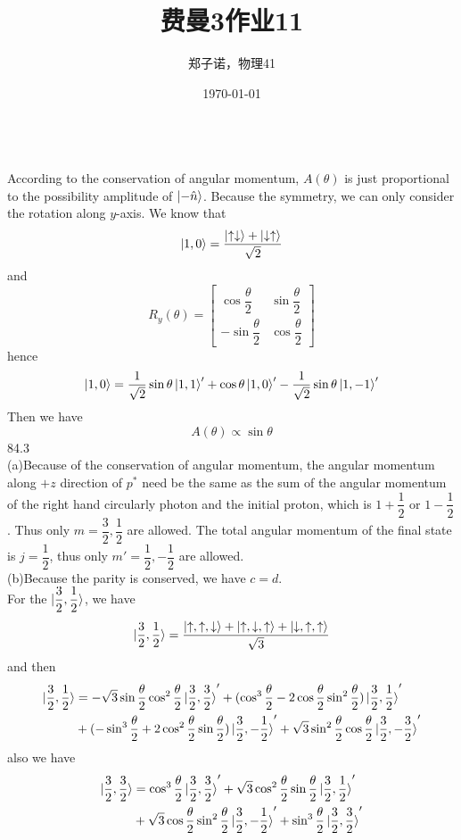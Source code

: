 \documentclass[utf8]{ctexart}
\title{费曼3作业11}
\author{郑子诺，物理41}
\date{\today}
\begin{document}
\maketitle
{}\\
According to the conservation of angular momentum, $A(\theta)$ is just proportional to the possibility amplitude of $\ket{-\hat{n}}$. Because the symmetry, we can only consider the rotation along $y$-axis. We know that
\[\ket{1,0}=\frac{\ket{\uparrow\downarrow}+\ket{\downarrow\uparrow}}{\sqrt{2}}\]
and
\[R_y(\theta)=\begin{bmatrix}
	\cos\dfrac{\theta}{2}&\sin\dfrac{\theta}{2}\\[8pt]
	-\sin\dfrac{\theta}{2}&\cos\dfrac{\theta}{2}
\end{bmatrix}\]
hence
\[\ket{1,0}=\frac{1}{\sqrt{2}}\sin\theta\ket{1,1}'+\cos\theta\ket{1,0}'-\frac{1}{\sqrt{2}}\sin\theta\ket{1,-1}'\]
Then we have
\[A(\theta)\propto\sin\theta\]
84.3\\
(a)Because of the conservation of angular momentum, the angular momentum along $+z$ direction of $p^*$ need be the same as the sum of the angular momentum of the right hand circularly photon and the initial proton, which is $1+\dfrac{1}{2}$ or $1-\dfrac{1}{2}$. Thus only $m=\dfrac{3}{2},\dfrac{1}{2}$ are allowed. The total angular momentum of the final state is $j=\dfrac{1}{2}$, thus only $m'=\dfrac{1}{2},-\dfrac{1}{2}$ are allowed.\\
(b)Because the parity is conserved, we have $c=d$.\\
For the $\ket{\dfrac{3}{2},\dfrac{1}{2}}$, we have
\[\ket{\frac{3}{2},\frac{1}{2}}=\frac{\ket{\uparrow,\uparrow,\downarrow}+\ket{\uparrow,\downarrow,\uparrow}+\ket{\downarrow,\uparrow,\uparrow}}{\sqrt{3}}\]
and then 
\begin{align*}
	\ket{\frac{3}{2},\frac{1}{2}}&=-\sqrt{3}\sin\frac{\theta}{2}\cos^2\frac{\theta}{2}\ket{\frac{3}{2},\frac{3}{2}}'+(\cos^3\frac{\theta}{2}-2\cos\frac{\theta}{2}\sin^2\frac{\theta}{2})\ket{\frac{3}{2},\frac{1}{2}}'\\
	&+(-\sin^3\frac{\theta}{2}+2\cos^2\frac{\theta}{2}\sin\frac{\theta}{2})\ket{\frac{3}{2},-\frac{1}{2}}'+\sqrt{3}\sin^2\frac{\theta}{2}\cos\frac{\theta}{2}\ket{\frac{3}{2},-\frac{3}{2}}'
\end{align*}
also we have
\begin{align*}
	\ket{\frac{3}{2},\frac{3}{2}}&=\cos^3\frac{\theta}{2}\ket{\frac{3}{2},\frac{3}{2}}'+\sqrt{3}\cos^2\frac{\theta}{2}\sin\frac{\theta}{2}\ket{\frac{3}{2},\frac{1}{2}}'\\
	&+\sqrt{3}\cos\frac{\theta}{2}\sin^2\frac{\theta}{2}\ket{\frac{3}{2},-\frac{1}{2}}'+\sin^3\frac{\theta}{2}\ket{\frac{3}{2},\frac{3}{2}}'
\end{align*}
\end{document}
